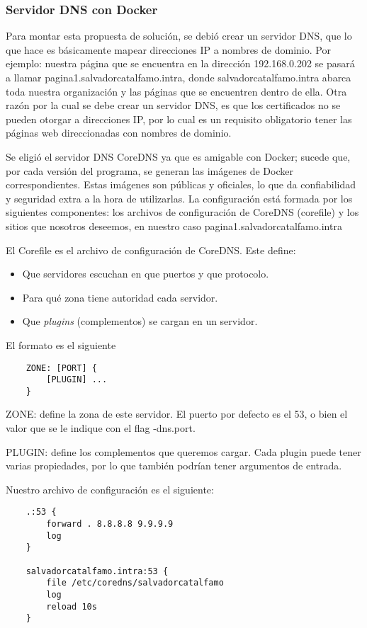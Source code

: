 \subsubsection*{Servidor DNS con Docker}

Para montar esta propuesta de solución, se debió crear un servidor DNS, que lo que hace
es básicamente mapear direcciones IP a nombres de dominio. Por ejemplo: nuestra página que 
se encuentra en la dirección 192.168.0.202 se pasará a llamar pagina1.salvadorcatalfamo.intra, 
donde salvadorcatalfamo.intra abarca toda nuestra organización y las páginas que se encuentren
dentro de ella. Otra razón por la cual se debe 
crear un servidor DNS, es que los certificados no se pueden otorgar a direcciones IP, por lo 
cual es un requisito obligatorio tener las páginas web direccionadas con nombres de dominio.

Se eligió el servidor DNS CoreDNS ya que es amigable con Docker; sucede que, por cada versión del 
programa, se generan las imágenes de Docker correspondientes. Estas imágenes son públicas y oficiales, 
lo que da confiabilidad y seguridad extra a la hora de utilizarlas. La configuración está formada por 
los siguientes componentes: los archivos de configuración de CoreDNS (corefile) y los sitios que 
nosotros deseemos, en nuestro caso pagina1.salvadorcatalfamo.intra

\noindent El Corefile es el archivo de configuración de CoreDNS. Este define:
\begin{itemize}
    \setlength\itemsep{-0.6em}
    \item Que servidores escuchan en que puertos y que protocolo.
    \item Para qué zona tiene autoridad cada servidor.
    \item Que \emph{plugins} (complementos) se cargan en un servidor.
\end{itemize}

\noindent El formato es el siguiente
\begin{verbatim}
    ZONE: [PORT] {
        [PLUGIN] ...
    }
\end{verbatim}

\noindent ZONE: define la zona de este servidor. El puerto por defecto es el 53, o bien el valor que se le indique 
con el flag -dns.port.

\noindent PLUGIN: define los complementos que queremos cargar. Cada plugin puede tener varias propiedades, por 
lo que también podrían tener argumentos de entrada.

\noindent Nuestro archivo de configuración es el siguiente:
\begin{verbatim}
    .:53 {
        forward . 8.8.8.8 9.9.9.9
        log
    }

    salvadorcatalfamo.intra:53 {
        file /etc/coredns/salvadorcatalfamo
        log
        reload 10s
    }    
\end{verbatim}

